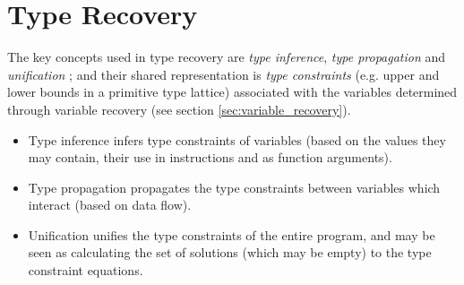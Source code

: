 
\section{Type Recovery}




The key concepts used in type recovery are \textit{type inference}, \textit{type propagation} and \textit{unification} \cite{mycroft_type_based_decompilation}; and their shared representation is \textit{type constraints} (e.g. upper and lower bounds in a primitive type lattice) associated with the variables determined through variable recovery (see section \ref{sec:variable_recovery}).

\begin{itemize}
	\item Type inference infers type constraints of variables (based on the values they may contain, their use in instructions and as function arguments).
	\item Type propagation propagates the type constraints between variables which interact (based on data flow).
	\item Unification unifies the type constraints of the entire program, and may be seen as calculating the set of solutions (which may be empty) to the type constraint equations.
\end{itemize}






